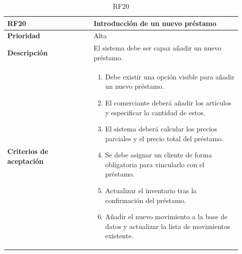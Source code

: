 \begin{table}[H]
	\centering %
	\begin{tabular}{|p{0.35\linewidth}|p{0.6\linewidth}|}
		\hline
		\rowcolor{grayshade} \textbf{RF20} & \textbf{Introducción de un nuevo préstamo} \\
		\hline
		\textbf{Prioridad} & Alta \\
		\hline
		\textbf{Descripción} & El sistema debe ser capaz añadir un nuevo préstamo.\\
		\hline
		\vspace{0.5mm}
		\textbf{Criterios de aceptación} & 
		\begin{minipage}[t]{0.9\linewidth}
			\begin{enumerate}
				\item Debe existir una opción visible para añadir un nuevo préstamo.
				\item El comerciante deberá añadir los artículos y especificar la cantidad de estos.  
				\item El sistema deberá calcular los precios parciales y el precio total del préstamo. 
				\item Se debe asignar un cliente de forma obligatoria para vincularlo con el préstamo. 
				\item Actualizar el inventario tras la confirmación del préstamo. 
				\item Añadir el nuevo movimiento a la base de datos y actualizar la lista de movimientos existente.  
			\end{enumerate}
			\vspace{2mm}
		\end{minipage} \\
		\hline
	\end{tabular}
	\caption{RF20}
\end{table}

